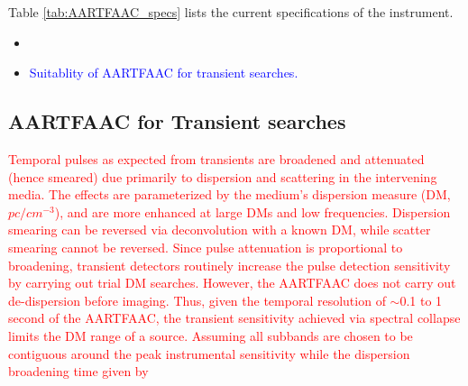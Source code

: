 \documentclass{aa}
\begin{document}
Table \ref{tab:AARTFAAC_specs} lists the current specifications of
the instrument. 

\begin{table}[tbh]

\caption{\label{tab:AARTFAAC_specs}Specifications of contemporary transient
detection instruments. The parameters are estimated at the highest
sensitivity of each instrument, viz, 60 MHz for AARTFAAC, 150 MHz
for the MWA and 74 MHz for the LWA, which observes continuously only
in its 'Narrow' mode.}
\end{table}

\begin{itemize}
\item 
\item \textcolor{blue}{Suitablity of AARTFAAC for transient searches.}
\end{itemize}

\subsection{\label{sub:AARTFAAC-for-Transient}AARTFAAC for Transient searches}

\textcolor{red}{Temporal pulses as expected from transients are broadened
and attenuated (hence smeared) due primarily to dispersion and scattering
in the intervening media. The effects are parameterized by the medium's
dispersion measure (DM, $pc/cm^{-3}$), and are more enhanced at large
DMs and low frequencies. Dispersion smearing can be reversed via deconvolution
with a known DM, while scatter smearing cannot be reversed. Since
pulse attenuation is proportional to broadening, transient detectors
routinely increase the pulse detection sensitivity by carrying out
trial DM searches. However, the AARTFAAC does not carry out de-dispersion
before imaging. Thus, given the temporal resolution of $\sim$0.1
to 1 second of the AARTFAAC, the transient sensitivity achieved via
spectral collapse limits the DM range of a source. Assuming all subbands
are chosen to be contiguous around the peak instrumental sensitivity
while the dispersion broadening time given by}
\end{document}
